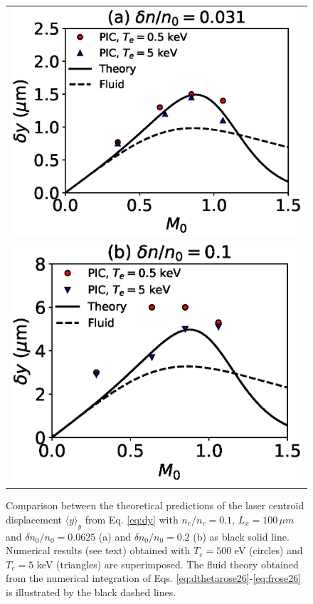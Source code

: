 \documentclass[%
 reprint,
 amsmath,amssymb,
 aps,
]{revtex4-1}
\begin{document}
\begin{figure}
\begin{tabular}{c}
\includegraphics[scale=0.49]{th_PIC_dnsn1s8a.eps} \\
\includegraphics[scale=0.49]{th_PIC_dnsn0p2b.eps}
\end{tabular}
\caption{ \label{fig:comthpic}  
Comparison between the theoretical predictions of the laser centro\"id displacement $\langle y \rangle_y$ from Eq. \eqref{eq:dy} with $n_e/n_c=0.1$, $L_x=100 \,\mu m$ and $\delta n_0/n_0=0.0625$ (a) and $\delta n_0/n_0=0.2$ (b) as black solid line. Numerical results (see text) obtained with $T_e=500$ eV (circles) and $T_e=5$ keV  (triangles) are superimposed. The fluid theory obtained from the numerical integration of Eqs. \eqref{eq:dthetarose26}-\eqref{eq:frose26} \cite{POP_Rose_96} is illustrated by the black dashed lines.
}
\end{figure}
\end{document}
